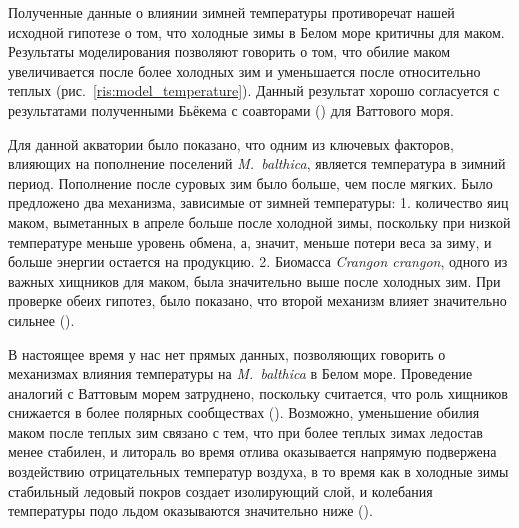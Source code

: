 Полученные данные о влиянии зимней температуры противоречат нашей исходной гипотезе о том, что холодные зимы в Белом море критичны для маком. 
Результаты моделирования позволяют говорить о том, что обилие маком увеличивается после более холодных зим и уменьшается после относительно теплых (рис.~\ref{ris:model_temperature}). 
Данный результат хорошо согласуется с результатами полученными Бьёкема с соавторами (\cite{Beukema_et_al_1998, Beukema_et_al_2009}) для Ваттового моря. 

Для данной акватории было показано, что одним из ключевых факторов, влияющих на пополнение поселений \textit{M.~balthica}, является температура в зимний период. 
Пополнение после суровых зим было больше, чем после мягких. 
Было предложено два механизма, зависимые от зимней температуры: 
1. количество яиц маком, выметанных в апреле больше после холодной зимы, поскольку при низкой температуре меньше уровень обмена, а, значит, меньше потери веса за зиму, и больше энергии остается на продукцию. 
2. Биомасса \textit{Crangon crangon}, одного из важных хищников для маком, была значительно выше после холодных зим. 
При проверке обеих гипотез, было показано, что второй механизм влияет значительно сильнее (\cite{Beukema_et_al_1998, Beukema_Dekker_2014, Dekker_Beukema_2014}). 

В настоящее время у нас нет прямых данных, позволяющих говорить о механизмах влияния температуры на \textit{M.~balthica} в Белом море. 
Проведение аналогий с Ваттовым морем затруднено, поскольку считается, что роль хищников снижается в более полярных сообществах (\cite{Pianka_1966, Freestone_et_al_2011}). 
Возможно, уменьшение обилия маком после теплых зим связано с тем, что при более теплых зимах ледостав менее стабилен, и литораль во время отлива оказывается напрямую подвержена воздействию отрицательных температур воздуха, в то время как в холодные зимы стабильный ледовый покров создает изолирующий слой, и колебания температуры подо льдом оказываются значительно ниже (\cite{Kuznecov_1960}).

\afterpage{\clearpage}
